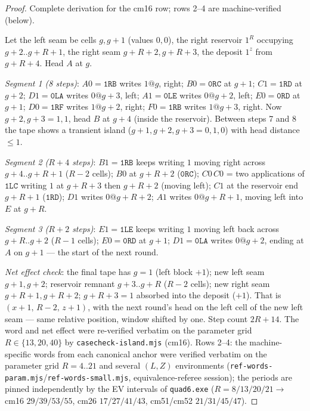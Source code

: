 \documentclass[11pt]{amsart}
\begin{document}
\begin{proof}
Complete derivation for the cm16 row; rows 2--4 are machine-verified (below).

Let the left seam be cells $g,g{+}1$ (values $0,0$), the right reservoir $1^R$ occupying $g{+}2..g{+}R{+}1$, the right seam $g{+}R{+}2,g{+}R{+}3$, the deposit $1^z$ from $g{+}R{+}4$. Head $A$ at $g$.

\emph{Segment 1 (8 steps)}: $A0{=}\texttt{1RB}$ writes $1@g$, right; $B0{=}\texttt{0RC}$ at $g{+}1$; $C1{=}\texttt{1RD}$ at $g{+}2$; $D1{=}\texttt{0LA}$ writes $0@g{+}3$, left; $A1{=}\texttt{0LE}$ writes $0@g{+}2$, left; $E0{=}\texttt{0RD}$ at $g{+}1$; $D0{=}\texttt{1RF}$ writes $1@g{+}2$, right; $F0{=}\texttt{1RB}$ writes $1@g{+}3$, right. Now $g{+}2,g{+}3=1,1$, head $B$ at $g{+}4$ (inside the reservoir). Between steps 7 and 8 the tape shows a transient island ($g{+}1,g{+}2,g{+}3=0,1,0$) with head distance $\le1$.

\emph{Segment 2 ($R{+}4$ steps)}: $B1{=}\texttt{1RB}$ keeps writing $1$ moving right across $g{+}4..g{+}R{+}1$ ($R{-}2$ cells); $B0$ at $g{+}R{+}2$ ($\texttt{0RC}$); $C0\,C0$ = two applications of $\texttt{1LC}$ writing $1$ at $g{+}R{+}3$ then $g{+}R{+}2$ (moving left); $C1$ at the reservoir end $g{+}R{+}1$ ($\texttt{1RD}$); $D1$ writes $0@g{+}R{+}2$; $A1$ writes $0@g{+}R{+}1$, moving left into $E$ at $g{+}R$.

\emph{Segment 3 ($R{+}2$ steps)}: $E1{=}\texttt{1LE}$ keeps writing $1$ moving left back across $g{+}R..g{+}2$ ($R{-}1$ cells); $E0{=}\texttt{0RD}$ at $g{+}1$; $D1{=}\texttt{0LA}$ writes $0@g{+}2$, ending at $A$ on $g{+}1$ --- the start of the next round.

\emph{Net effect check}: the final tape has $g{=}1$ (left block $+1$); new left seam $g{+}1,g{+}2$; reservoir remnant $g{+}3..g{+}R$ ($R{-}2$ cells); new right seam $g{+}R{+}1,g{+}R{+}2$; $g{+}R{+}3{=}1$ absorbed into the deposit ($+1$). That is $(x{+}1,\,R{-}2,\,z{+}1)$, with the next round's head on the left cell of the new left seam --- same relative position, window shifted by one. Step count $2R{+}14$. The word and net effect were re-verified verbatim on the parameter grid $R\in\{13,20,40\}$ by \texttt{casecheck-island.mjs} (cm16). Rows 2--4: the machine-specific words from each canonical anchor were verified verbatim on the parameter grid $R=4..21$ and several $(L,Z)$ environments (\texttt{ref-words-param.mjs}/\texttt{ref-words-small.mjs}, equivalence-referee session); the periods are pinned independently by the EV intervals of \texttt{quad6.exe} ($R{=}8/13/20/21\to$ cm16 $29/39/53/55$, cm26 $17/27/41/43$, cm51/cm52 $21/31/45/47$).
\end{proof}
\end{document}
